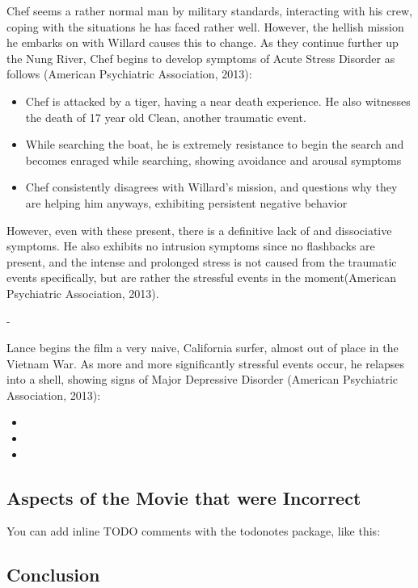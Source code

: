 \documentclass[a4paper,man,natbib]{apa6}
\begin{document}
Chef seems a rather normal man by military standards, interacting with his crew, coping with the situations he has faced rather well. However, the hellish mission he embarks on with Willard causes this to change. As they continue further up the Nung River, Chef begins to develop symptoms of Acute Stress Disorder as follows (American Psychiatric Association, 2013):
\begin{itemize}
\item Chef is attacked by a tiger, having a near death experience. He also witnesses the death of 17 year old Clean, another traumatic event.
\item While searching the boat, he is extremely resistance to begin the search and becomes enraged while searching, showing avoidance and arousal symptoms
\item Chef consistently disagrees with Willard's mission, and questions why they are helping him anyways, exhibiting persistent negative behavior
\end{itemize}
However, even with these present, there is a definitive lack of and dissociative symptoms. He also exhibits no intrusion symptoms since no flashbacks are present, and the intense and prolonged stress is not caused from the traumatic events specifically, but are rather the stressful events in the moment(American Psychiatric Association, 2013).

-


Lance begins the film a very naive, California surfer, almost out of place in the Vietnam War. As more and more significantly stressful events occur, he relapses into a shell, showing signs of Major Depressive Disorder (American Psychiatric Association, 2013):
\begin{itemize}
\item 
\item 
\item 
\end{itemize}


\subsection{Aspects of the Movie that were Incorrect}

You can add inline TODO comments with the todonotes package, like this:

\subsection{Conclusion}	
\end{document}
